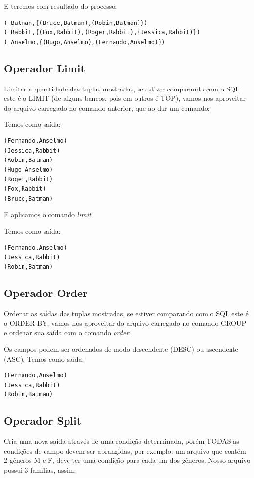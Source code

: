 \documentclass[a4paper,11pt]{article}
\begin{document}
E teremos com resultado do processo:
\begin{lstlisting}[]
( Batman,{(Bruce,Batman),(Robin,Batman)})
( Rabbit,{(Fox,Rabbit),(Roger,Rabbit),(Jessica,Rabbit)})
( Anselmo,{(Hugo,Anselmo),(Fernando,Anselmo)})
\end{lstlisting}

\subsection{Operador Limit}
Limitar a quantidade das tuplas mostradas, se estiver comparando com o SQL este é o LIMIT (de alguns bancos, pois em outros é TOP), vamos nos aproveitar do arquivo carregado no comando anterior, que ao dar um comando: \\

Temos como saída:
\begin{lstlisting}[]
(Fernando,Anselmo)
(Jessica,Rabbit)
(Robin,Batman)
(Hugo,Anselmo)
(Roger,Rabbit)
(Fox,Rabbit)
(Bruce,Batman)
\end{lstlisting}

E aplicamos o comando \textit{limit}: \\

Temos como saída:
\begin{lstlisting}[]
(Fernando,Anselmo)
(Jessica,Rabbit)
(Robin,Batman)
\end{lstlisting}

\subsection{Operador Order}
Ordenar as saídas das tuplas mostradas, se estiver comparando com o SQL este é o ORDER BY, vamos nos aproveitar do arquivo carregado no comando GROUP e ordenar sua saída com o comando \textit{order}: \\

Os campos podem ser ordenados de modo descendente (DESC) ou ascendente (ASC). Temos como saída:
\begin{lstlisting}[]
(Fernando,Anselmo)
(Jessica,Rabbit)
(Robin,Batman)
\end{lstlisting}

\subsection{Operador Split}
Cria uma nova saída através de uma condição determinada, porém TODAS as condições de campo devem ser abrangidas, por exemplo: um arquivo que contém 2 gêneros M e F, deve ter uma condição para cada um dos gêneros. Nosso arquivo possui 3 famílias, assim:\\
\end{document}
